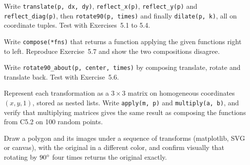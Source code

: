\begin{codeexercises}
\item Write \lstinline!translate(p, dx, dy)!, \lstinline!reflect_x(p)!, \lstinline!reflect_y(p)! and \lstinline!reflect_diag(p)!, then \lstinline!rotate90(p, times)! and finally \lstinline!dilate(p, k)!, all on coordinate tuples. Test with Exercises~5.1 to 5.4.
\item Write \lstinline!compose(*fns)! that returns a function applying the given functions right to left. Reproduce Exercise~5.7 and show the two compositions disagree.
\item Write \lstinline!rotate90_about(p, center, times)! by composing translate, rotate and translate back. Test with Exercise~5.6.
\item Represent each transformation as a $3 \times 3$ matrix on homogeneous coordinates $(x, y, 1)$, stored as nested lists. Write \lstinline!apply(m, p)! and \lstinline!multiply(a, b)!, and verify that multiplying matrices gives the same result as composing the functions from C5.2 on 100 random points.
\item Draw a polygon and its images under a sequence of transforms (matplotlib, SVG or canvas), with the original in a different color, and confirm visually that rotating by $90^\circ$ four times returns the original exactly.
\end{codeexercises}
